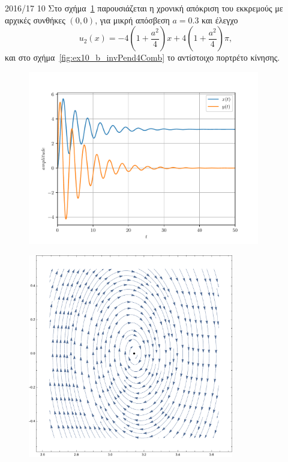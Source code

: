 \begin{solution}{2016/17 10}
    Στο σχήμα~\ref{fig:ex10_b_invPend4a} παρουσιάζεται η χρονική απόκριση του
    εκκρεμούς με αρχικές συνθήκες \( (0, 0) \), για μικρή απόσβεση \( a = 0.3 \)
    και έλεγχο
    \[
        u_2(x) = -4\left(1 + \frac{a^2}{4}\right)x +
        4\left(1 + \frac{a^2}{4}\right)\pi,
    \]
    και στο σχήμα~\ref{fig:ex10_b_invPend4Comb} το αντίστοιχο πορτρέτο κίνησης.
    \begin{figure}[h]
        \centering
        \includegraphics[width=0.9\textwidth]{figures/ex10_b_invPend4a.pdf}
        \caption{}
        \label{fig:ex10_b_invPend4a}
    \end{figure}
    \begin{figure}[h]
        \centering
        \includegraphics[width=0.8\textwidth]{figures/ex10_b_invPend4Comb.pdf}

\end{figure}
\end{solution}

